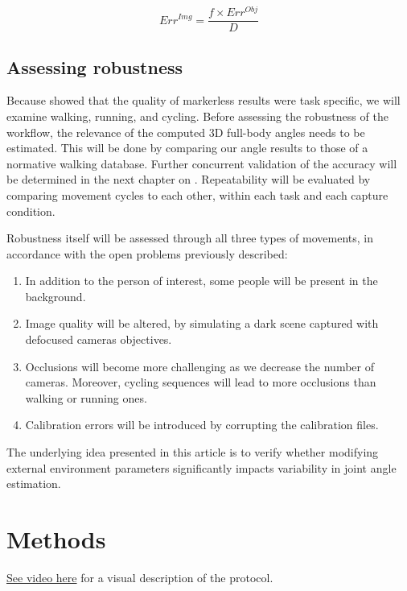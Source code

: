 \begin{equation}
      Err^{Img} = \frac{f \times Err^{Obj}}{D} 
      \label{eqn:errobjimg}
\end{equation}


\subsection{Assessing robustness}

Because \cite{Needham2021a} showed that the quality of markerless results were task specific, we will examine walking, running, and cycling. Before assessing the robustness of the workflow, the relevance of the computed 3D full-body angles needs to be estimated. This will be done by comparing our angle results to those of a normative walking database. Further concurrent validation of the accuracy will be determined in the next chapter on . Repeatability will be evaluated by comparing movement cycles to each other, within each task and each capture condition. 

Robustness itself will be assessed through all three types of movements, in accordance with the open problems previously described:
\begin{enumerate}[itemsep=0em, topsep=0em, leftmargin=*]
      \item In addition to the person of interest, some people will be present in the background. 
      \item Image quality will be altered, by simulating a dark scene captured with defocused cameras objectives.
      \item Occlusions will become more challenging as we decrease the number of cameras. Moreover, cycling sequences will lead to more occlusions than walking or running ones.
      \item Calibration errors will be introduced by corrupting the calibration files.
\end{enumerate}

The underlying idea presented in this article is to verify whether modifying external environment parameters significantly impacts variability in joint angle estimation.


\section{Methods}

\href{https://github.com/davidpagnon/These_David_Pagnon/blob/main/Thesis/Chap4/Figures/Vid_Protocol.mp4?raw=true}{See video here} for a visual description of the protocol.

